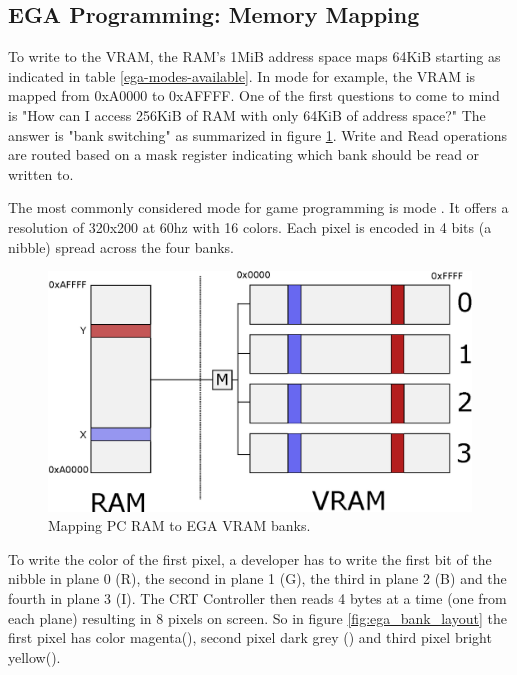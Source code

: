 \documentclass[book.tex]{subfiles}
\begin{document}
 \subsection{EGA Programming: Memory Mapping}
To write to the VRAM, the RAM's 1MiB address space maps 64KiB starting as indicated in table \ref{ega-modes-available}. In mode  for example, the VRAM is mapped from 0xA0000 to 0xAFFFF. One of the first questions to come to mind is "How can I access 256KiB of RAM with only 64KiB of address space?" The answer is "bank switching" as summarized in figure \ref{ram_to_ega_mapping_label}. Write and Read operations are routed based on a mask register indicating which bank should be read or written to. \\

\par
 The most commonly considered mode for game programming is mode . It offers a resolution of 320x200 at 60hz with 16 colors. Each pixel is encoded in 4 bits (a nibble) spread across the four banks.\\
\par



\begin{figure}[H]
  \centering
  \includegraphics[width=.8\textwidth]{imgs/drawings/ram_to_ega_mapping.eps}
  \caption{Mapping PC RAM to EGA VRAM banks.}
  \label{ram_to_ega_mapping_label}
\end{figure}
\par
 To write the color of the first pixel, a developer has to write the first bit of the nibble in plane 0 (R), the second in plane 1 (G), the third in plane 2 (B) and the fourth in plane 3 (I). The CRT Controller then reads 4 bytes at a time (one from each plane) resulting in 8 pixels on screen. So in figure \ref{fig:ega_bank_layout} the first pixel has color magenta(), second pixel  dark grey () and third pixel  bright yellow().\\
\par
 
\end{document}
